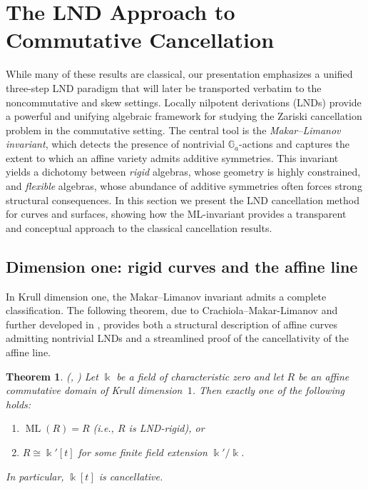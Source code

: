\documentclass{amsart}
\theoremstyle{plain}
\newtheorem{theorem}{Theorem}
\numberwithin{theorem}{section}
\numberwithin{equation}{theorem}
\theoremstyle{definition}
\DeclareMathOperator{\ML}{ML}
\begin{document}
\section{The LND Approach to Commutative Cancellation}
\label{sec:LND-comm}
While many of these results are classical, our presentation emphasizes a unified
three-step LND paradigm that will later be transported verbatim to the
noncommutative and skew settings.
Locally nilpotent derivations (LNDs) provide a powerful and unifying algebraic
framework for studying the Zariski cancellation problem in the commutative setting.
The central tool is the \emph{Makar--Limanov invariant}, which detects the presence
of nontrivial $\mathbb{G}_a$-actions and captures the extent to which an affine
variety admits additive symmetries.  
This invariant yields a dichotomy between \emph{rigid} algebras, whose geometry is
highly constrained, and \emph{flexible} algebras, whose abundance of additive
symmetries often forces strong structural consequences.  
In this section we present the LND cancellation method for curves and surfaces,
showing how the ML-invariant provides a transparent and conceptual approach to the
classical cancellation results.

\subsection{Dimension one: rigid curves and the affine line}

In Krull dimension one, the Makar--Limanov invariant admits a complete
classification.  The following theorem, due to Crachiola--Makar-Limanov
\cite{CM2} and further developed in \cite{BHHV}, provides both a structural
description of affine curves admitting nontrivial LNDs and a streamlined proof of
the cancellativity of the affine line.

\begin{theorem}(\cite[Lemma 2.3]{CM2}, \cite[Remark 5.4]{BHHV})
\label{thm:curves}
Let $\Bbbk$ be a field of characteristic zero and let $R$ be an affine
commutative domain of Krull dimension~$1$.  
Then exactly one of the following holds:
\begin{enumerate}
    \item $\ML(R) = R$ (i.e., $R$ is LND-rigid), or
    \item $R \cong \Bbbk'[t]$ for some finite field extension $\Bbbk'/\Bbbk$.
\end{enumerate}
In particular, $\Bbbk[t]$ is cancellative.
\end{theorem}
\end{document}
